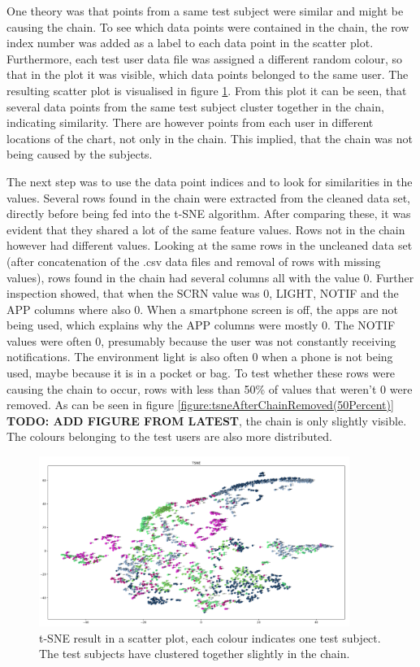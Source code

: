 One theory was that points from a same test subject were similar and might be causing the chain. To see which data points were contained in the chain, the row index number was added as a label to each data point in the scatter plot. Furthermore, each test user data file was assigned a different random colour, so that in the plot it was visible, which data points belonged to the same user. The resulting scatter plot is visualised in figure \ref{figure:tsneTestSubjectsColor}. From this plot it can be seen, that several data points from the same test subject cluster together in the chain, indicating similarity. There are however points from each user in different locations of the chart, not only in the chain. This implied, that the chain was not being caused by the subjects. 

The next step was to use the data point indices and to look for similarities in the values. Several rows found in the chain were extracted from the cleaned data set, directly before being fed into the t-SNE algorithm. After comparing these, it was evident that they shared a lot of the same feature values. Rows not in the chain however had different values. Looking at the same rows in the uncleaned data set (after concatenation of the .csv data files and removal of rows with missing values), rows found in the chain had several columns all with the value 0. Further inspection showed, that when the SCRN value was 0, LIGHT, NOTIF and the APP columns where also 0. When a smartphone screen is off, the apps are not being used, which explains why the APP columns were mostly 0. The NOTIF values were often 0, presumably because the user was not constantly receiving notifications. The environment light is also often 0 when a phone is not being used, maybe because it is in a pocket or bag. To test whether these rows were causing the chain to occur, rows with less than 50\% of values that weren't 0 were removed. As can be seen in figure \ref{figure:tsneAfterChainRemoved(50Percent)} \textbf{TODO: ADD FIGURE FROM LATEST}, the chain is only slightly visible. The colours belonging to the test users are also more distributed.


\begin{figure}[h]
  \centering
  \includegraphics[width=0.9\textwidth]{./images/tsneTestSubjectsColor.png}
  \caption{t-SNE result in a scatter plot, each colour indicates one test subject. The test subjects have clustered together slightly in the chain.}
  \label{figure:tsneTestSubjectsColor}
\end{figure}

